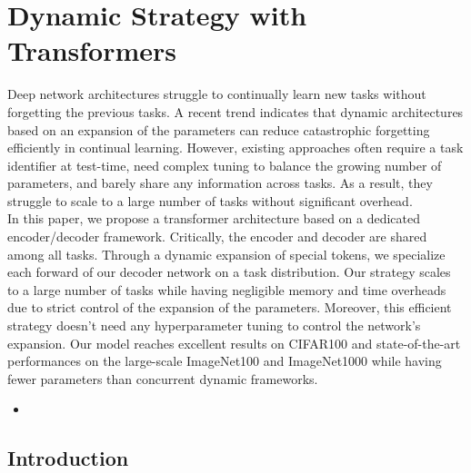 \chapter{Dynamic Strategy with Transformers}
\label{chapter:dynamic}

\begin{chapabstract}
    Deep network architectures struggle to continually learn new tasks without forgetting the
    previous tasks. A recent trend indicates that dynamic architectures based on an expansion of the
    parameters can reduce catastrophic forgetting efficiently in continual learning. However,
    existing approaches often require a task identifier at test-time, need complex tuning to balance
    the growing number of parameters, and barely share any information across tasks. As a result,
    they struggle to scale to a large number of tasks without significant overhead.\\
    In this paper, we propose a transformer architecture based on a dedicated encoder/decoder
    framework. Critically, the encoder and decoder are shared among all tasks. Through a dynamic
    expansion of special tokens, we specialize each forward of our decoder network on a task
    distribution. Our strategy scales to a large number of tasks while having negligible memory and
    time overheads due to strict control of the expansion of the parameters. Moreover, this
    efficient strategy doesn't need any hyperparameter tuning to control the network's expansion.
    Our model reaches excellent results on CIFAR100 and state-of-the-art performances on the
    large-scale ImageNet100 and ImageNet1000 while having fewer parameters than concurrent dynamic
    frameworks.

    \begin{itemize}
        \item {}
    \end{itemize}

\end{chapabstract}
\newpage

\minitoc
{} 



\section{Introduction}
\label{sec:dytox_intro}

